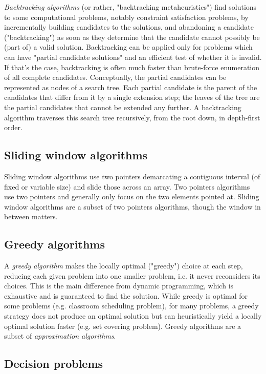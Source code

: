 \documentclass[table, xcdraw]{article}%
\begin{document}
\emph{Backtracking algorithms} (or rather, "backtracking metaheuristics") find solutions to some computational problems, notably constraint satisfaction problems, by incrementally building candidates to the solutions, and abandoning a candidate ("backtracking") as soon as they determine that the candidate cannot possibly be (part of) a valid solution. Backtracking can be applied only for problems which can have "partial candidate solutions" and an efficient test of whether it is invalid. If that's the case, backtracking is often much faster than brute-force enumeration of all complete candidates. Conceptually, the partial candidates can be represented as nodes of a search tree. Each partial candidate is the parent of the candidates that differ from it by a single extension step; the leaves of the tree are the partial candidates that cannot be extended any further. A backtracking algorithm traverses this search tree recursively, from the root down, in depth-first order.

\subsection{Sliding window algorithms}

Sliding window algorithms use two pointers demarcating a contiguous interval (of fixed or variable size) and slide those across an array. Two pointers algorithms use two pointers and generally only focus on the two elements pointed at. Sliding window algorithms are a subset of two pointers algorithms, though the window in between matters.

\subsection{Greedy algorithms}

A \emph{greedy algorithm} makes the locally optimal ("greedy") choice at each step, reducing each given problem into one smaller problem, i.e. it never reconsiders its choices. This is the main difference from dynamic programming, which is exhaustive and is guaranteed to find the solution. While greedy is optimal for some problems (e.g. classroom scheduling problem), for many problems, a greedy strategy does not produce an optimal solution but can heuristically yield a locally optimal solution faster (e.g. set covering problem). Greedy algorithms are a subset of \emph{approximation algorithms}.

\subsection{Decision problems}
\end{document}

